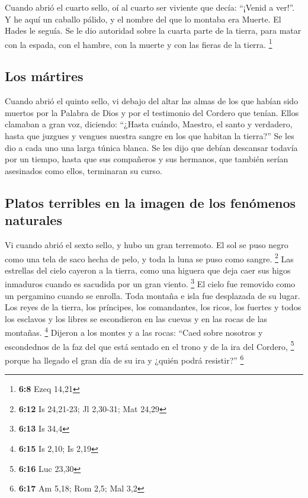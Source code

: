 \begin{paracol}{2}
 Cuando abrió el cuarto sello, oí al cuarto ser viviente
que decía: ``¡Venid a ver!''.  Y he aquí un caballo
pálido, y el nombre del que lo montaba era Muerte. El Hades le seguía.
Se le dio autoridad sobre la cuarta parte de la tierra, para matar con
la espada, con el hambre, con la muerte y con las fieras de la tierra.
\footnote{\textbf{6:8} Ezeq 14,21}

\hypertarget{los-muxe1rtires}{%
\subsection{Los mártires}\label{los-muxe1rtires}}

 Cuando abrió el quinto sello, vi debajo del altar las
almas de los que habían sido muertos por la Palabra de Dios y por el
testimonio del Cordero que tenían.  Ellos clamaban a gran
voz, diciendo: ``¿Hasta cuándo, Maestro, el santo y verdadero, hasta que
juzgues y vengues nuestra sangre en los que habitan la tierra?''
 Se les dio a cada uno una larga túnica blanca. Se les
dijo que debían descansar todavía por un tiempo, hasta que sus
compañeros y sus hermanos, que también serían asesinados como ellos,
terminaran su curso.

\hypertarget{platos-terribles-en-la-imagen-de-los-fenuxf3menos-naturales}{%
\subsection{Platos terribles en la imagen de los fenómenos
naturales}\label{platos-terribles-en-la-imagen-de-los-fenuxf3menos-naturales}}

 Vi cuando abrió el sexto sello, y hubo un gran
terremoto. El sol se puso negro como una tela de saco hecha de pelo, y
toda la luna se puso como sangre. \footnote{\textbf{6:12} Is 24,21-23;
  Jl 2,30-31; Mat 24,29}  Las estrellas del cielo cayeron
a la tierra, como una higuera que deja caer sus higos inmaduros cuando
es sacudida por un gran viento. \footnote{\textbf{6:13} Is 34,4}
 El cielo fue removido como un pergamino cuando se
enrolla. Toda montaña e isla fue desplazada de su lugar. 
Los reyes de la tierra, los príncipes, los comandantes, los ricos, los
fuertes y todos los esclavos y los libres se escondieron en las cuevas y
en las rocas de las montañas. \footnote{\textbf{6:15} Is 2,10; Is 2,19}
 Dijeron a los montes y a las rocas: ``Caed sobre
nosotros y escondednos de la faz del que está sentado en el trono y de
la ira del Cordero, \footnote{\textbf{6:16} Luc 23,30} 
porque ha llegado el gran día de su ira y ¿quién podrá resistir?''
\footnote{\textbf{6:17} Am 5,18; Rom 2,5; Mal 3,2}


\end{paracol}
